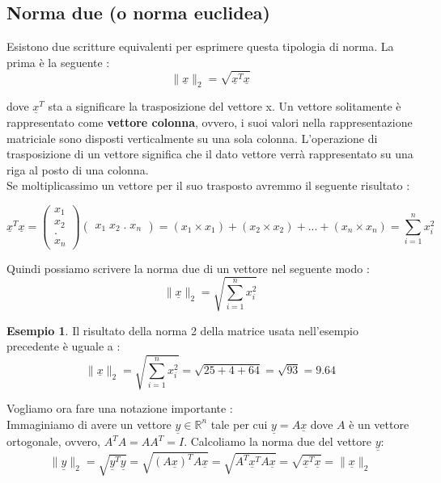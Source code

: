 \documentclass[12pt, a4paper]{book}
\theoremstyle{definition}
\newtheorem{exmp}{Esempio}[section]
\newcommand{\VarMtrx}[1]{\ensuremath{\underline{#1}}}
\begin{document}
\subsection{Norma due (o norma euclidea)}
\begin{flushleft}
Esistono due scritture equivalenti per esprimere questa tipologia di norma.  La prima è la seguente  : 
\[ \lVert\VarMtrx{x}\rVert_{2} = \sqrt{\VarMtrx{x}^{T}\VarMtrx{x}} \]

dove $\VarMtrx{x}^{T}$ sta a significare la trasposizione del vettore x. 
Un vettore solitamente è rappresentato come \textbf{vettore colonna}, ovvero, i suoi valori nella rappresentazione matriciale sono disposti verticalmente su una  sola colonna. L'operazione di trasposizione di un vettore significa che il dato vettore verrà rappresentato su una riga al posto di una colonna. \\
\vspace{1em}
Se moltiplicassimo un vettore per il suo trasposto avremmo il seguente risultato : 

\[ 
	 \VarMtrx{x}^{T}\VarMtrx{x} = \begin{pmatrix} x_{1} \\ x_{2} \\ .\\ x_{n}  \end{pmatrix} \begin{pmatrix} x_{1} \; x_{2} \; . \; x_{n}  \end{pmatrix}  = 
	 (x_{1} \times x_{1}) + (x_{2} \times x_{2}) + ...  + (x_{n} \times x_{n})
	 = \sum_{i=1}^{n} x_{i}^{2}
\]

Quindi possiamo scrivere la norma due di un vettore nel seguente modo : 
\[ \lVert\VarMtrx{x}\rVert_{2} = \sqrt{\sum_{i=1}^{n} x_{i}^{2}} \]

\begin{exmp}
Il risultato della norma 2 della matrice usata nell'esempio precedente è uguale a : 
\[ \lVert\VarMtrx{x}\rVert_{2}  = \sqrt{\sum_{i=1}^{n} x_{i}^{2}}  = \sqrt{25 + 4 + 64} = \sqrt{93} = 9.64 \]
\end{exmp}

Vogliamo ora fare una notazione importante :\\
Immaginiamo di avere un vettore $\VarMtrx{y} \in \mathbb{R}^{n}$ tale per cui $\VarMtrx{y} = A\VarMtrx{x}$ dove $A$ è un vettore ortogonale, ovvero,  $A^{T}A = AA^{T} = I$.
\vspace{1em}
Calcoliamo la norma due del vettore \VarMtrx{y}:
\[ \lVert\VarMtrx{y}\rVert_{2}  = \sqrt{\VarMtrx{y}^{T}\VarMtrx{y}} = \sqrt{(A\VarMtrx{x})^{T}A\VarMtrx{x}}  = \sqrt{A^{T}\VarMtrx{x}^{T}A\VarMtrx{x}} = \sqrt{\VarMtrx{x}^{T}\VarMtrx{x}} = \lVert\VarMtrx{x}\rVert_{2}\]
\end{flushleft}
\end{document}
